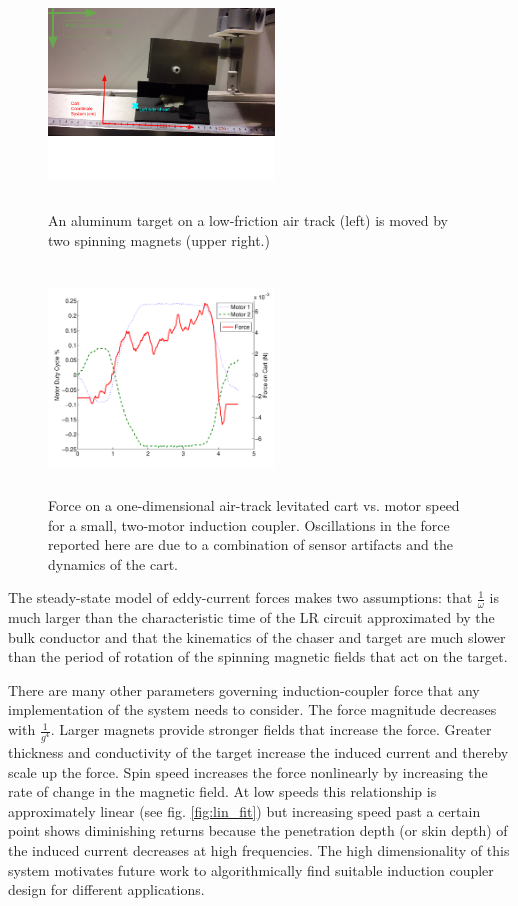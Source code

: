 \begin{figure}
\includegraphics[width = 6cm, height = 6cm ]{figures/cart_on_track.png}

\caption{An aluminum target on a low-friction air track (left) is moved by two spinning magnets (upper right.)}
\label{fig:cart_picture}
\end{figure}


\begin{figure}
\includegraphics[width = 6cm, height = 6cm ]{figures/motor_force_speed_plot.pdf}

\caption{Force on a one-dimensional air-track levitated cart vs. motor speed for a small, two-motor induction coupler. Oscillations in the force reported here are due to a combination of sensor artifacts and the dynamics of the cart.}
\label{fig:force_plot}
\end{figure}

The steady-state model of eddy-current forces makes two assumptions: that $\frac{1}{\omega}$ is much larger than the characteristic time of the LR circuit approximated by the bulk conductor and that the kinematics of the chaser and target are much slower than the period of rotation of the spinning magnetic fields that act on the target.

There are many other parameters governing induction-coupler force that any implementation of the system needs to consider. The force magnitude decreases with $\frac{1}{g^4}$. Larger magnets provide stronger fields that increase the force. Greater thickness and 
conductivity of the target increase the induced current and thereby scale up the force. Spin speed increases the force nonlinearly by increasing the rate of change in the magnetic field. At low speeds this relationship is approximately linear (see fig. \ref{fig:lin_fit}) but increasing speed past a certain point shows diminishing returns because the penetration depth (or skin depth) of the induced current decreases at high frequencies. \cite{Paudel2013} The high dimensionality of this system motivates future work to algorithmically find suitable induction coupler design for different applications.